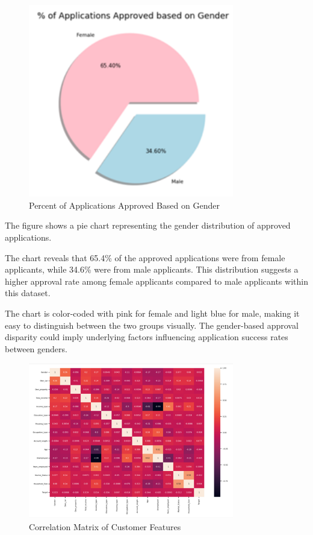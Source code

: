 \documentclass[12pt]{report}
\begin{document}
    \begin{figure}[h!]
        \centering
        \includegraphics[width=0.8\textwidth]{resources/pic/Percent of Applications Approved Based on Gender.png}
        \caption{Percent of Applications Approved Based on Gender}
        \label{Percent of Applications Approved Based on Gender}
    \end{figure}

    The figure shows a pie chart representing the gender distribution of approved applications.

    The chart reveals that 65.4\% of the approved applications were from female applicants, while 34.6\% were from male applicants. This distribution suggests a higher approval rate among female applicants compared to male applicants within this dataset.

    The chart is color-coded with pink for female and light blue for male, making it easy to distinguish between the two groups visually. The gender-based approval disparity could imply underlying factors influencing application success rates between genders.

    \begin{figure}[h!]
        \centering
        \includegraphics[width=0.8\textwidth]{resources/pic/Correlation Matrix of Customer Features.png}
        \caption{Correlation Matrix of Customer Features}
        \label{Correlation Matrix of Customer Features}
    \end{figure}
\end{document}
